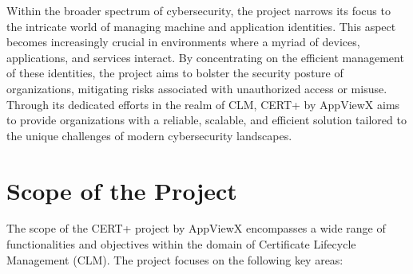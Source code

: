 \documentclass[10pt]{report}
\begin{document}
Within the broader spectrum of cybersecurity, the project narrows its focus to the intricate world of managing machine and application identities. This aspect becomes increasingly crucial in environments where a myriad of devices, applications, and services interact. By concentrating on the efficient management of these identities, the project aims to bolster the security posture of organizations, mitigating risks associated with unauthorized access or misuse. Through its dedicated efforts in the realm of CLM, CERT+ by AppViewX aims to provide organizations with a reliable, scalable, and efficient solution tailored to the unique challenges of modern cybersecurity landscapes.

\section*{Scope of the Project}

The scope of the CERT+ project by AppViewX encompasses a wide range of functionalities and objectives within the domain of Certificate Lifecycle Management (CLM). The project focuses on the following key areas:
\end{document}
